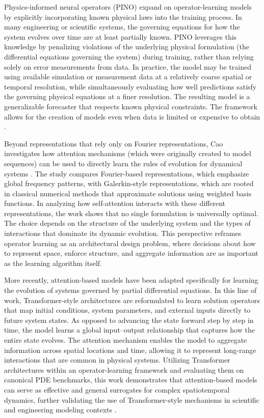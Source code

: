Physics-informed neural operators (PINO) expand on operator-learning models by explicitly incorporating known physical laws into the training process. In many engineering or scientific systems, the governing equations for how the system evolves over time are at least partially known. PINO leverages this knowledge by penalizing violations of the underlying physical formulation (the differential equations governing the system) during training, rather than relying solely on error measurements from data. In practice, the model may be trained using available simulation or measurement data at a relatively coarse spatial or temporal resolution, while simultaneously evaluating how well predictions satisfy the governing physical equations at a finer resolution. The resulting model is a generalizable forecaster that respects known physical constraints. The framework allows for the creation of models even when data is limited or expensive to obtain \cite{li2021pino}.

Beyond representations that rely only on Fourier representations, Cao investigates how attention mechanisms (which were originally created to model sequences) can be used to directly learn the rules of evolution for dynamical systems \cite{cao2021choose}. The study compares Fourier-based representations, which emphasize global frequency patterns, with Galerkin-style representations, which are rooted in classical numerical methods that approximate solutions using weighted basis functions. In analyzing how self-attention interacts with these different representations, the work shows that no single formulation is universally optimal. The choice depends on the structure of the underlying system and the types of interactions that dominate its dynamic evolution. This perspective reframes operator learning as an architectural design problem, where decisions about how to represent space, enforce structure, and aggregate information are as important as the learning algorithm itself.

More recently, attention-based models have been adapted specifically for learning the evolution of systems governed by partial differential equations. In this line of work, Transformer-style architectures are reformulated to learn solution operators that map initial conditions, system parameters, and external inputs directly to future system states. As opposed to advancing the state forward step by step in time, the model learns a global input–output relationship that captures how the entire state evolves. The attention mechanism enables the model to aggregate information across spatial locations and time, allowing it to represent long-range interactions that are common in physical systems. Utilizing Transformer architectures within an operator-learning framework and evaluating them on canonical PDE benchmarks, this work demonstrates that attention-based models can serve as effective and general surrogates for complex spatiotemporal dynamics, further validating the use of Transformer-style mechanisms in scientific and engineering modeling contexts \cite{li2023transformerpde}.

